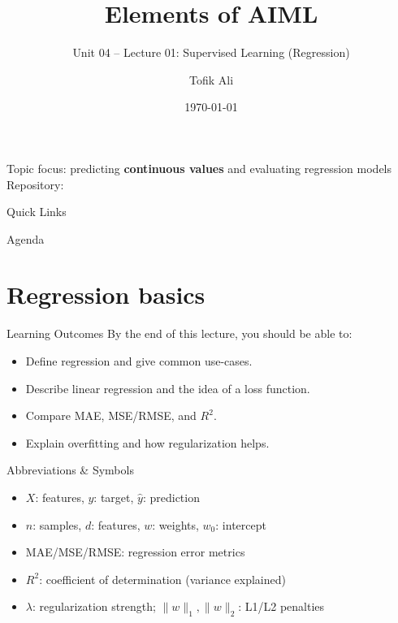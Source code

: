\documentclass[aspectratio=169]{beamer}
\title[Elements of AIML]{Elements of AIML}
\subtitle{Unit 04 -- Lecture 01: Supervised Learning (Regression)}
\author{Tofik Ali}
\institute{School of Computer Science, UPES Dehradun}
\date{\today}
\begin{document}
\UPESCoverFrame
\setcounter{framenumber}{0}

\begin{frame}
  \titlepage
  \vspace{0.3em}
  \begin{center}
    \footnotesize Topic focus: predicting \textbf{continuous values} and evaluating regression models\\[0.25em]
    \footnotesize Repository: \texttt{\AIMLRepoURL}
  \end{center}
  \slidesources{\AIMLUnitIVSources}
\end{frame}

\begin{frame}{Quick Links}
  \centering
  \hyperlink{sec:reg}{}\hspace{0.6em}
  \hyperlink{sec:linear}{}\hspace{0.6em}
  \hyperlink{sec:metrics}{}\hspace{0.6em}
  \hyperlink{sec:overfit}{}\hspace{0.6em}
  \hyperlink{sec:summary}{}
\end{frame}

\begin{frame}{Agenda}
  \tableofcontents
\end{frame}

\section{Regression basics}
\label{sec:reg}

\begin{frame}{Learning Outcomes}
  By the end of this lecture, you should be able to:
  \begin{itemize}[<+->]
    \item Define regression and give common use-cases.
    \item Describe linear regression and the idea of a loss function.
    \item Compare MAE, MSE/RMSE, and $R^2$.
    \item Explain overfitting and how regularization helps.
  \end{itemize}
\end{frame}

\begin{frame}{Abbreviations \& Symbols}
  \begin{itemize}[<+->]
    \item $X$: features,\; $y$: target,\; $\hat{y}$: prediction
    \item $n$: samples,\; $d$: features,\; $w$: weights,\; $w_0$: intercept
    \item MAE/MSE/RMSE: regression error metrics
    \item $R^2$: coefficient of determination (variance explained)
    \item $\lambda$: regularization strength; $\|w\|_1,\|w\|_2$: L1/L2 penalties
  \end{itemize}
\end{frame}
\end{document}
